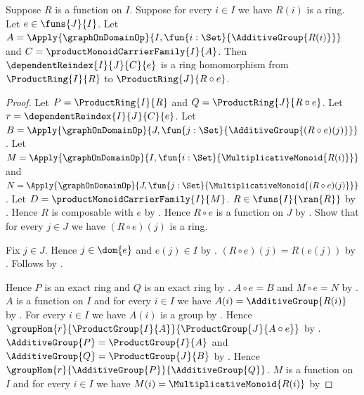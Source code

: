 \begin{theorem}\label{product_ring_reindex_hom}
    Suppose $R$ is a function on $I$.
    Suppose for every $i\in I$ we have $R(i)$ is a ring.
    Let $e\in\funs{J}{I}$.
    Let
        $A=\Apply{\graphOnDomainOp}{
            I,\fun{i:\Set}{\AdditiveGroup{R(i)}}}$ and
        $C=\productMonoidCarrierFamily{I}{A}$.
    Then $\dependentReindex{I}{J}{C}{e}$ is a ring homomorphism from
        $\ProductRing{I}{R}$ to $\ProductRing{J}{R\circ e}$.
\end{theorem}
\begin{proof}
    Let $P=\ProductRing{I}{R}$ and $Q=\ProductRing{J}{R\circ e}$.
    Let $r=\dependentReindex{I}{J}{C}{e}$.
    Let
        $B=\Apply{\graphOnDomainOp}{
            J,\fun{j:\Set}{\AdditiveGroup{(R\circ e)(j)}}}$.
    Let
        $M=\Apply{\graphOnDomainOp}{
            I,\fun{i:\Set}{\MultiplicativeMonoid{R(i)}}}$ and
        $N=\Apply{\graphOnDomainOp}{
            J,\fun{j:\Set}{\MultiplicativeMonoid{(R\circ e)(j)}}}$.
    Let $D=\productMonoidCarrierFamily{I}{M}$.
    $R\in\funs{I}{\ran{R}}$ by
        .
    Hence $R$ is composable with $e$ by .
    Hence $R\circ e$ is a function on $J$ by
        .
    Show that for every $j\in J$ we have $(R\circ e)(j)$ is a ring.
    \begin{subproof}
        Fix $j\in J$.
        Hence $j\in\dom{e}$ and $e(j)\in I$ by
            .
        $(R\circ e)(j)=R(e(j))$ by
            .
        Follows by \auto.
    \end{subproof}
    Hence $P$ is an exact ring and $Q$ is an exact ring by
        .
    $A\circ e=B$ and $M\circ e=N$ by
        .
    $A$ is a function on $I$ and for every $i\in I$ we have
        $A(i)=\AdditiveGroup{R(i)}$ by
        .
    For every $i\in I$ we have $A(i)$ is a group by
        .
    Hence $\groupHom{r}{\ProductGroup{I}{A}}{
        \ProductGroup{J}{A\circ e}}$ by
        .
    $\AdditiveGroup{P}=\ProductGroup{I}{A}$ and
        $\AdditiveGroup{Q}=\ProductGroup{J}{B}$ by
        .
    Hence $\groupHom{r}{\AdditiveGroup{P}}{\AdditiveGroup{Q}}$.
    $M$ is a function on $I$ and for every $i\in I$ we have
        $M(i)=\MultiplicativeMonoid{R(i)}$ by

\end{proof}
